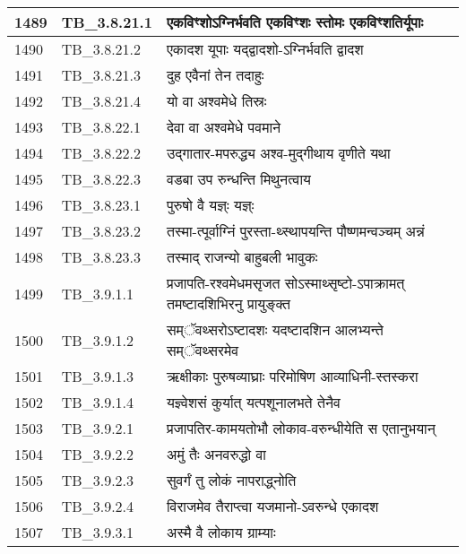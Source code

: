 \documentclass[17pt]{extarticle}
\begin{document}
\begin{longtable}{||p{0.4in}||p{0.9in}||p{4.0in}||p{0.9in}||}
        \hline
            1489 & TB\_3.8.21.1 & एकविꣳशोऽग्निर्भवति एकविꣳशः स्तोमः एकविꣳशतिर्यूपाः &      \\
        \hline
            1490 & TB\_3.8.21.2 & एकादश यूपाः यद्द्वादशो{-}ऽग्निर्भवति द्वादश &      \\
        \hline
            1491 & TB\_3.8.21.3 & दुह एवैनां तेन तदाहुः &      \\
        \hline
            1492 & TB\_3.8.21.4 & यो वा अश्वमेधे तिस्रः &      \\
        \hline
            1493 & TB\_3.8.22.1 & देवा वा अश्वमेधे पवमाने &      \\
        \hline
            1494 & TB\_3.8.22.2 & उद्गातार{-}मपरुद्ध्य अश्व{-}मुद्गीथाय वृणीते यथा &      \\
        \hline
            1495 & TB\_3.8.22.3 & वडबा उप रुन्धन्ति मिथुनत्वाय &      \\
        \hline
            1496 & TB\_3.8.23.1 & पुरुषो वै यज्ञ्ः यज्ञ्ः &      \\
        \hline
            1497 & TB\_3.8.23.2 & तस्मा{-}त्पूर्वाग्निं पुरस्ता{-}थ्स्थापयन्ति पौष्णमन्वञ्चम् अन्नं &      \\
        \hline
            1498 & TB\_3.8.23.3 & तस्माद् राजन्यो बाहुबली भावुकः &      \\
        \hline
            1499 & TB\_3.9.1.1 & प्रजापति{-}रश्वमेधमसृजत सोऽस्माथ्सृष्टो{-}ऽपाक्रामत् तमष्टादशिभिरनु प्रायुङ्क्त &      \\
        \hline
            1500 & TB\_3.9.1.2 & सम्ॅवथ्सरोऽष्टादशः यदष्टादशिन आलभ्यन्ते सम्ॅवथ्सरमेव &      \\
        \hline
            1501 & TB\_3.9.1.3 & ऋक्षीकाः पुरुषव्याघ्राः परिमोषिण आव्याधिनी{-}स्तस्करा &      \\
        \hline
            1502 & TB\_3.9.1.4 & यज्ञ्वेशसं कुर्यात् यत्पशूनालभते तेनैव &      \\
        \hline
            1503 & TB\_3.9.2.1 & प्रजापतिर{-}कामयतोभौ लोकाव{-}वरुन्धीयेति स एतानुभयान् &      \\
        \hline
            1504 & TB\_3.9.2.2 & अमुं तैः अनवरुद्धो वा &      \\
        \hline
            1505 & TB\_3.9.2.3 & सुवर्गं तु लोकं नापराद्ध्नोति &      \\
        \hline
            1506 & TB\_3.9.2.4 & विराजमेव तैराप्त्वा यजमानो{-}ऽवरुन्धे एकादश &      \\
        \hline
            1507 & TB\_3.9.3.1 & अस्मै वै लोकाय ग्राम्याः &      \\

\end{longtable}
\end{document}
